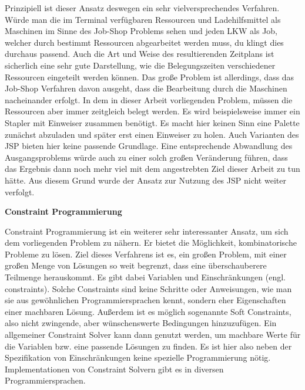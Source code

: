 Prinzipiell ist dieser Ansatz deswegen ein sehr vielversprechendes Verfahren. Würde man die im Terminal verfügbaren Ressourcen und Ladehilfsmittel als Maschinen im Sinne des Job-Shop Problems sehen und jeden LKW als Job, welcher durch bestimmt Ressourcen abgearbeitet werden muss, du klingt dies durchaus passend. Auch die Art und Weise des resultierenden Zeitplans ist sicherlich eine sehr gute Darstellung, wie die Belegungszeiten verschiedener Ressourcen eingeteilt werden können. Das große Problem ist allerdings, dass das Job-Shop Verfahren davon ausgeht, dass die Bearbeitung durch die Maschinen nacheinander erfolgt. In dem in dieser Arbeit vorliegenden Problem, müssen die Ressourcen aber immer zeitgleich belegt werden. Es wird beispielsweise immer ein Stapler mit Einweiser zusammen benötigt. Es macht hier keinen Sinn eine Palette zunächst abzuladen und später erst einen Einweiser zu holen. Auch Varianten des JSP bieten hier keine passende Grundlage. Eine entsprechende Abwandlung des Ausgangsproblems würde auch zu einer solch großen Veränderung führen, dass das Ergebnis dann noch mehr viel mit dem angestrebten Ziel dieser Arbeit zu tun hätte. Aus diesem Grund wurde der Ansatz zur Nutzung des JSP nicht weiter verfolgt.


\textbf{Constraint Programmierung}

Constraint Programmierung ist ein weiterer sehr interessanter Ansatz, um sich dem vorliegenden Problem zu nähern. Er bietet die Möglichkeit, kombinatorische Probleme zu lösen. Ziel dieses Verfahrens ist es, ein großen Problem, mit einer großen Menge von Lösungen so weit begrenzt, dass eine überschauberere Teilmenge herauskommt. Es gibt dabei Variablen und Einschränkungen (engl. constraints). Solche Constraints sind keine Schritte oder Anweisungen, wie man sie aus gewöhnlichen Programmiersprachen kennt, sondern eher Eigenschaften einer machbaren Lösung. Außerdem ist es möglich sogenannte \glqq{}Soft Constraints\grqq{}, also nicht zwingende, aber wünschenswerte Bedingungen hinzuzufügen. Ein allgemeiner Constraint Solver kann dann genutzt werden, um machbare Werte für die Variablen bzw. eine passende Lösungen zu finden. Es ist hier also neben der Spezifikation von Einschränkungen keine spezielle Programmierung nötig. Implementationen von Constraint Solvern gibt es in diversen Programmiersprachen. \cite{constraintProgramming}

